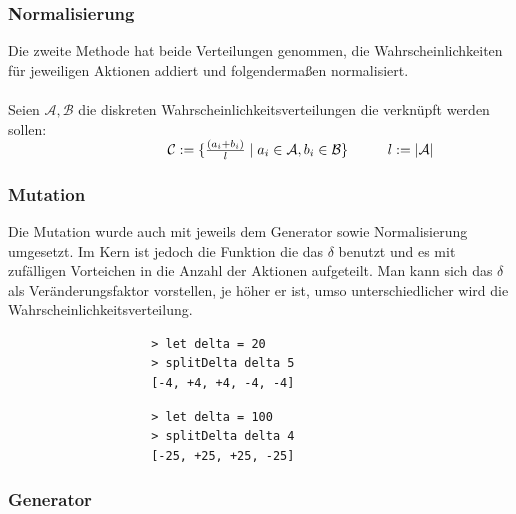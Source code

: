             \subsubsection*{Normalisierung}
            Die zweite Methode hat beide Verteilungen genommen, die Wahrscheinlichkeiten für jeweiligen Aktionen addiert und folgendermaßen normalisiert.\\
            \\
            \noindent
            Seien $\mathcal{A, B}$ die diskreten Wahrscheinlichkeitsverteilungen die verknüpft werden sollen: \\
            \begin{math}
            \\
            \hspace*{+4cm} \mathcal{C} := \{ \frac{(a_i + b_i)}{l} \; | \; a_i \in \mathcal{A}, b_i \in \mathcal{B}\} \hspace*{10mm} l := |\mathcal{A}|
            \\
            \end{math}
            \\
            \noindent

            \subsubsection*{Mutation}
            Die Mutation wurde auch mit jeweils dem Generator sowie Normalisierung umgesetzt. Im Kern ist jedoch die Funktion die das $\delta$ benutzt und es mit zufälligen Vorteichen in die Anzahl der Aktionen aufgeteilt. Man kann sich das $\delta$ als Veränderungsfaktor vorstellen, je höher er ist, umso unterschiedlicher wird die Wahrscheinlichkeitsverteilung.
            \begin{multicols}{2}
                \begin{verbatim}
                    > let delta = 20
                    > splitDelta delta 5
                    [-4, +4, +4, -4, -4]
                \end{verbatim}
                \begin{verbatim}
                    > let delta = 100
                    > splitDelta delta 4
                    [-25, +25, +25, -25]
                \end{verbatim}
            \end{multicols}

            \subsubsection*{Generator}

